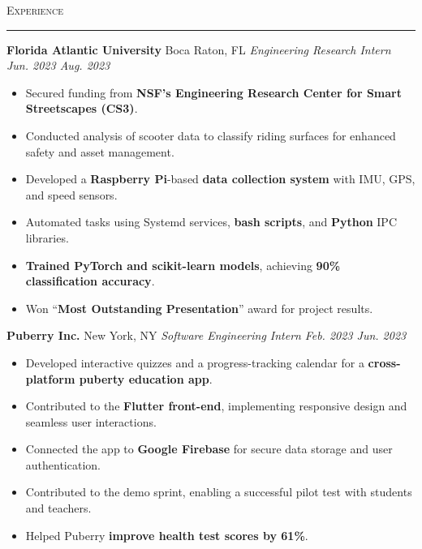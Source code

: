 \documentclass[11pt,letterpaper]{article}
\begin{document}
\vspace{4pt}
\textsc{\large{Experience}} 
\vspace{4pt}
\hrule
\begin{list}{}{\setlength{\leftmargin}{1em}\setlength{\rightmargin}{2pt}}
  
    \item
        \normalsize{\textbf{Florida Atlantic University}} \hfill Boca Raton, FL
          \vspace{2pt} \newline
          \small{\textit{Engineering Research Intern}} \hfill \small{\textit{Jun. 2023 \textendash \space Aug. 2023}}
          \vspace{0pt}
          \begin{itemize}[itemsep=-5pt, topsep=-2pt]
              \item Secured funding from \textbf{NSF's Engineering Research Center for Smart Streetscapes (CS3)}.
              \item Conducted analysis of scooter data to classify riding surfaces for enhanced safety and asset management.
              \item Developed a \textbf{Raspberry Pi}-based \textbf{data collection system} with IMU, GPS, and speed sensors.
              \item Automated tasks using Systemd services, \textbf{bash scripts}, and \textbf{Python} IPC libraries.
              \item \textbf{Trained PyTorch and scikit-learn models}, achieving \textbf{90\% classification accuracy}.
              \item Won ``\textbf{Most Outstanding Presentation}'' award for project results.
          \end{itemize}
          \vspace{4pt}

    \item
        \normalsize{\textbf{Puberry Inc.}} \hfill New York, NY
          \vspace{2pt} \newline
          \small{\textit{Software Engineering Intern}} \hfill \small{\textit{Feb. 2023 \textendash \space Jun. 2023}}
          \vspace{0pt}
          \begin{itemize}[itemsep=-4pt, topsep=-2pt]
              \item Developed interactive quizzes and a progress-tracking calendar for a \textbf{cross-platform puberty education app}.
              \item Contributed to the \textbf{Flutter front-end}, implementing responsive design and seamless user interactions.
              \item Connected the app to \textbf{Google Firebase} for secure data storage and user authentication.
              \item Contributed to the demo sprint, enabling a successful pilot test with students and teachers.
              \item Helped Puberry \textbf{improve health test scores by 61\%}.
          \end{itemize}
\end{list}
\end{document}
